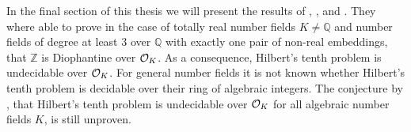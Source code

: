 In the final section of this thesis we will present the results of
\textcite{Denef1980}, \textcite{Pheidas1988}, and \textcite{Shlapentokh1989}.
They where able to prove in the case of totally real number fields \(K ≠ ℚ\) and
number fields of degree at least \(3\) over \(ℚ\) with exactly one pair of
non-real embeddings, that \(ℤ\) is Diophantine over \(\mathcal{O}_{K}\). As a
consequence, Hilbert's tenth problem is undecidable over \(\mathcal{O}_{K}\). For
general number fields it is not known whether Hilbert's tenth problem is
decidable over their ring of algebraic integers. The conjecture by
\textcite{Denef1978}, that Hilbert's tenth problem is undecidable over
\(\mathcal{O}_{K}\) for all algebraic number fields \(K\), is still unproven.
